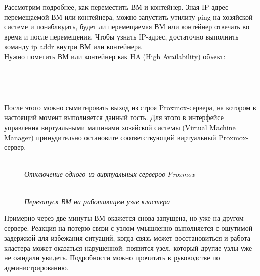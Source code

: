 \documentclass[14pt, a4paper]{article}
\begin{document}
Рассмотрим подробнее, как переместить ВМ и контейнер. Зная IP-адрес перемещаемой ВМ или
контейнера, можно запустить утилиту ping на хозяйской системе и понаблюдать, будет ли
перемещаемая ВМ или контейнер отвечать во время и после перемещения. Чтобы узнать IP-адрес,
достаточно выполнить команду \colorbox{backcolour}{ip addr} внутри ВМ или контейнера.\\

Нужно пометить ВМ или контейнер как HA (High Availability) объект:

\begin{figure}[h]
    \centering
    \\  
    \label{framework} 
\end{figure}

\begin{figure}[h]
    \centering
    \\  
    \label{framework} 
\end{figure}

После этого можно сымитировать выход из строя Proxmox-сервера, на котором в настоящий момент
выполняется данный гость. Для этого в интерфейсе управления виртуальными машинами хозяйской
системы (Virtual Machine Manager) принудительно остановите соответствующий виртуальный
Proxmox-сервер.

\begin{figure}[h]
    \centering
    \\ 
    \small\textit{Отключение одного из виртуальных серверов Proxmox}  
    \label{framework} 
\end{figure}

\newpage

\begin{figure}[h]
    \centering
    \\ 
    \small\textit{Перезапуск ВМ на работающем узле кластера}  
    \label{framework} 
\end{figure}

Примерно через две минуты ВМ окажется снова запущена, но уже на другом сервере. Реакция на
потерю связи с узлом умышленно выполняется с ощутимой задержкой для избежания ситуаций, когда
связь может восстановиться и работа кластера может оказаться нарушенной: появится узел, который
другие узлы уже не ожидали увидеть. Подробности можно прочитать в 
\href{https://pve.proxmox.com/pve-docs/pve-admin-guide.html#chapter_ha_manager}{руководстве по администрированию}.\\
\end{document}
